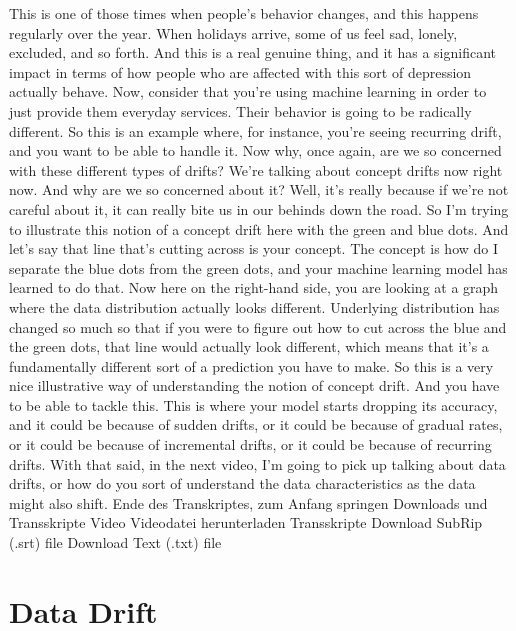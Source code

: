 {{{{{{{{    This is one of those times when people's behavior changes,
    and this happens regularly over the year.
    When holidays arrive, some of us feel sad, lonely, excluded, and so forth.
    And this is a real genuine thing, and it has a significant impact
    in terms of how people who are affected with this sort of depression actually
    behave.
    Now, consider that you're using machine learning in order
    to just provide them everyday services.
    Their behavior is going to be radically different.
    So this is an example where, for instance,
    you're seeing recurring drift, and you want to be able to handle it.
    Now why, once again, are we so concerned with these different types of drifts?
    We're talking about concept drifts now right now.
    And why are we so concerned about it?
    Well, it's really because if we're not careful about it,
    it can really bite us in our behinds down the road.
    So I'm trying to illustrate this notion of a concept drift
    here with the green and blue dots.
    And let's say that line that's cutting across is your concept.
    The concept is how do I separate the blue dots from the green dots,
    and your machine learning model has learned to do that.
    Now here on the right-hand side, you are looking at a graph
    where the data distribution actually looks different.
    Underlying distribution has changed so much so
    that if you were to figure out how to cut across the blue and the green dots,
    that line would actually look different, which
    means that it's a fundamentally different sort of a prediction you
    have to make.
    So this is a very nice illustrative way of understanding
    the notion of concept drift.
    And you have to be able to tackle this.
    This is where your model starts dropping its accuracy,
    and it could be because of sudden drifts,
    or it could be because of gradual rates, or it
    could be because of incremental drifts, or it
    could be because of recurring drifts.
    With that said, in the next video, I'm going
    to pick up talking about data drifts, or how do you
    sort of understand the data characteristics
    as the data might also shift.
    Ende des Transkriptes, zum Anfang springen
    Downloads und Transskripte
    Video
    Videodatei herunterladen
    Transskripte
    Download SubRip (.srt) file
    Download Text (.txt) file

\section{Data Drift}

}}}}}}}}
